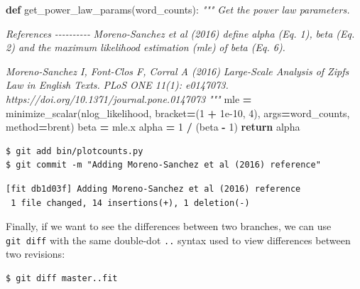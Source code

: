 \documentclass[
]{krantz}
\makeatletter
\newenvironment{Shaded}{\begin{snugshade}}{\end{snugshade}}
\newcommand{\CommentTok}[1]{\textcolor[rgb]{0.56,0.35,0.01}{\textit{#1}}}
\newcommand{\ControlFlowTok}[1]{\textcolor[rgb]{0.13,0.29,0.53}{\textbf{#1}}}
\newcommand{\DecValTok}[1]{\textcolor[rgb]{0.00,0.00,0.81}{#1}}
\newcommand{\FloatTok}[1]{\textcolor[rgb]{0.00,0.00,0.81}{#1}}
\newcommand{\KeywordTok}[1]{\textcolor[rgb]{0.13,0.29,0.53}{\textbf{#1}}}
\newcommand{\NormalTok}[1]{#1}
\newcommand{\OperatorTok}[1]{\textcolor[rgb]{0.81,0.36,0.00}{\textbf{#1}}}
\newcommand{\StringTok}[1]{\textcolor[rgb]{0.31,0.60,0.02}{#1}}
\newenvironment{kframe}{%
\medskip{}
\setlength{\fboxsep}{.8em}
 \def\at@end@of@kframe{}%
 \ifinner\ifhmode%
  \def\at@end@of@kframe{\end{minipage}}%
  \begin{minipage}{\columnwidth}%
 \fi\fi%
 \def\FrameCommand##1{\hskip\@totalleftmargin \hskip-\fboxsep
 \colorbox{shadecolor}{##1}\hskip-\fboxsep
     \hskip-\linewidth \hskip-\@totalleftmargin \hskip\columnwidth}%
 \MakeFramed {\advance\hsize-\width
   \@totalleftmargin\z@ \linewidth\hsize
   \@setminipage}}%
 {\par\unskip\endMakeFramed%
 \at@end@of@kframe}
\renewenvironment{Shaded}{\begin{kframe}}{\end{kframe}}
\makeatother
\begin{document}
\begin{Shaded}
\begin{Highlighting}[]
\KeywordTok{def}\NormalTok{ get\_power\_law\_params(word\_counts):}
    \CommentTok{"""}
\CommentTok{    Get the power law parameters.}

\CommentTok{    References}
\CommentTok{    {-}{-}{-}{-}{-}{-}{-}{-}{-}{-}}
\CommentTok{    Moreno{-}Sanchez et al (2016) define alpha (Eq. 1),}
\CommentTok{      beta (Eq. 2) and the maximum likelihood estimation (mle)}
\CommentTok{      of beta (Eq. 6).}

\CommentTok{    Moreno{-}Sanchez I, Font{-}Clos F, Corral A (2016)}
\CommentTok{      Large{-}Scale Analysis of Zipf\textquotesingle{}s Law in English Texts.}
\CommentTok{      PLoS ONE 11(1): e0147073.}
\CommentTok{      https://doi.org/10.1371/journal.pone.0147073}
\CommentTok{    """}
\NormalTok{    mle }\OperatorTok{=}\NormalTok{ minimize\_scalar(nlog\_likelihood, bracket}\OperatorTok{=}\NormalTok{(}\DecValTok{1} \OperatorTok{+} \FloatTok{1e{-}10}\NormalTok{, }\DecValTok{4}\NormalTok{),}
\NormalTok{                          args}\OperatorTok{=}\NormalTok{word\_counts, method}\OperatorTok{=}\StringTok{\textquotesingle{}brent\textquotesingle{}}\NormalTok{)}
\NormalTok{    beta }\OperatorTok{=}\NormalTok{ mle.x}
\NormalTok{    alpha }\OperatorTok{=} \DecValTok{1} \OperatorTok{/}\NormalTok{ (beta }\OperatorTok{{-}} \DecValTok{1}\NormalTok{)}
    \ControlFlowTok{return}\NormalTok{ alpha}
\end{Highlighting}
\end{Shaded}

\begin{verbatim}
$ git add bin/plotcounts.py
$ git commit -m "Adding Moreno-Sanchez et al (2016) reference"
\end{verbatim}

\begin{verbatim}
[fit db1d03f] Adding Moreno-Sanchez et al (2016) reference
 1 file changed, 14 insertions(+), 1 deletion(-)
\end{verbatim}

Finally,
if we want to see the differences between two branches,
we can use \texttt{git\ diff} with the same double-dot \texttt{..} syntax
used to view differences between two revisions:

\begin{verbatim}
$ git diff master..fit
\end{verbatim}
\end{document}
